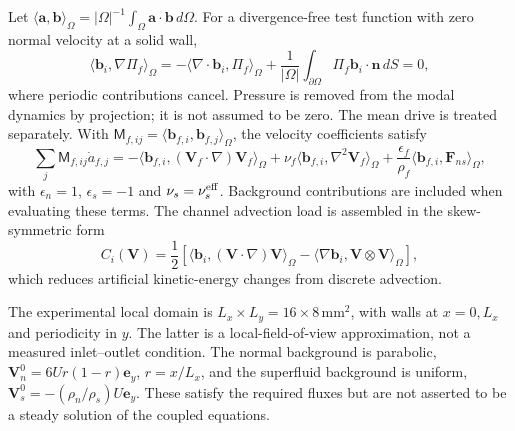 \documentclass[11pt]{article}
\numberwithin{equation}{section}
\begin{document}
Let $\langle\mathbf a,\mathbf b\rangle_\Omega=|\Omega|^{-1}\int_\Omega\mathbf a\cdot\mathbf b\,d\Omega$. For a divergence-free test function with zero normal velocity at a solid wall,
\begin{equation}
 \langle\mathbf b_i,\nabla\Pi_f\rangle_\Omega
 =-\langle\nabla\cdot\mathbf b_i,\Pi_f\rangle_\Omega
  +\frac1{|\Omega|}\int_{\partial\Omega}\Pi_f\mathbf b_i\cdot\mathbf n\,dS
 =0,
 \label{eq:pressureprojection}
\end{equation}
where periodic contributions cancel. Pressure is removed from the modal dynamics by projection; it is not assumed to be zero. The mean drive is treated separately. With $\mathsf M_{f,ij}=\langle\mathbf b_{f,i},\mathbf b_{f,j}\rangle_\Omega$, the velocity coefficients satisfy
\begin{equation}
 \sum_j\mathsf M_{f,ij}\dot a_{f,j}
 =-\langle\mathbf b_{f,i},(\mathbf V_f\cdot\nabla)\mathbf V_f\rangle_\Omega
   +\nu_f\langle\mathbf b_{f,i},\nabla^2\mathbf V_f\rangle_\Omega
   +\frac{\epsilon_f}{\rho_f}\langle\mathbf b_{f,i},\mathbf F_{ns}\rangle_\Omega,
 \label{eq:galerkinmomentum}
\end{equation}
with $\epsilon_n=1$, $\epsilon_s=-1$ and $\nu_s=\nu_s^{\rm eff}$. Background contributions are included when evaluating these terms. The channel advection load is assembled in the skew-symmetric form
\begin{equation}
 C_i(\mathbf V)=\frac12\left[
 \langle\mathbf b_i,(\mathbf V\cdot\nabla)\mathbf V\rangle_\Omega
 -\langle\nabla\mathbf b_i,\mathbf V\otimes\mathbf V\rangle_\Omega\right],
 \label{eq:skewadvection}
\end{equation}
which reduces artificial kinetic-energy changes from discrete advection.

The experimental local domain is $L_x\times L_y=16\times8\,\mathrm{mm}^2$, with walls at $x=0,L_x$ and periodicity in $y$. The latter is a local-field-of-view approximation, not a measured inlet--outlet condition. The normal background is parabolic, $\mathbf V_n^0=6U r(1-r)\mathbf e_y$, $r=x/L_x$, and the superfluid background is uniform, $\mathbf V_s^0=-(\rho_n/\rho_s)U\mathbf e_y$. These satisfy the required fluxes but are not asserted to be a steady solution of the coupled equations.
\end{document}
